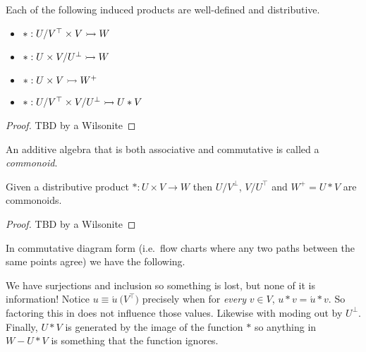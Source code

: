 \begin{proposition}
    Each of the following induced products are well-defined and distributive.
    \begin{itemize}
        \item $*:U/V^{\top} \times V\rightarrowtail W$
        \item $*:U \times V/U^{\bot}\rightarrowtail W$
        \item $*:U \times V\rightarrowtail W^+$
        \item $*:U/V^{\top} \times V/U^{\bot}\rightarrowtail U*V$
    \end{itemize}
\end{proposition}
\begin{proof}
    TBD by a Wilsonite
\end{proof}

\begin{definition}
    An additive algebra that is both associative and commutative is called a \emph{commonoid}.
\end{definition}

\begin{proposition}
    Given a distributive product $*:U\times V\to W$ then 
    $U/V^{\bot}$, $V/U^{\top}$ and $W^+=U*V$ are commonoids.
\end{proposition}
\begin{proof}
    TBD by a Wilsonite
\end{proof}

In commutative diagram form (i.e.\ flow charts where any two paths between the same points agree) we have the following.
\begin{center}
\end{center}
We have surjections and inclusion so something is lost, but none of it is information!
Notice $u\equiv \acute{u}\pod{V^{\top}}$ precisely when for \emph{every} $v\in V$,
$u*v=\acute{u}*v$.  So factoring this in does not influence those values.  Likewise 
with moding out by $U^{\bot}$.  Finally, $U*V$ is generated by the image of the function $*$ so 
anything in $W-U*V$ is something that the function ignores.

